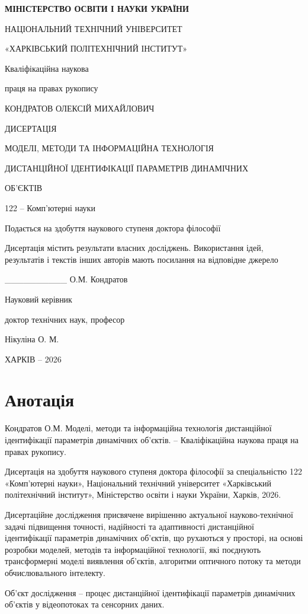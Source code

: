\documentclass[
]{article}
\author{}
\date{}
\begin{document}
\textbf{МІНІСТЕРСТВО ОСВІТИ І НАУКИ УКРАЇНИ}

НАЦІОНАЛЬНИЙ ТЕХНІЧНИЙ УНІВЕРСИТЕТ

«ХАРКІВСЬКИЙ ПОЛІТЕХНІЧНИЙ ІНСТИТУТ»

Кваліфікаційна наукова

праця на правах рукопису

КОНДРАТОВ ОЛЕКСІЙ МИХАЙЛОВИЧ

ДИСЕРТАЦІЯ

МОДЕЛІ, МЕТОДИ ТА ІНФОРМАЦІЙНА ТЕХНОЛОГІЯ

ДИСТАНЦІЙНОЇ ІДЕНТИФІКАЦІЇ ПАРАМЕТРІВ ДИНАМІЧНИХ

ОБ'ЄКТІВ

122 -- Комп'ютерні науки

Подається на здобуття наукового ступеня доктора філософії

Дисертація містить результати власних досліджень. Використання ідей, результатів і текстів інших авторів мають посилання на відповідне джерело

\_\_\_\_\_\_\_\_\_\_ О.М. Кондратов

Науковий керівник

доктор технічних наук, професор

Нікуліна О. М.

ХАРКІВ -- 2026

\section{Анотація}\label{ux430ux43dux43eux442ux430ux446ux456ux44f}

Кондратов О.М. Моделі, методи та інформаційна технологія дистанційної ідентифікації параметрів динамічних об'єктів. -- Кваліфікаційна наукова праця на правах рукопису.

Дисертація на здобуття наукового ступеня доктора філософії за спеціальністю 122 «Комп'ютерні науки», Національний технічний університет «Харківський політехнічний інститут», Міністерство освіти і науки України, Харків, 2026.

Дисертаційне дослідження присвячене вирішенню актуальної науково-технічної задачі підвищення точності, надійності та адаптивності дистанційної ідентифікації параметрів динамічних об'єктів, що рухаються у просторі, на основі розробки моделей, методів та інформаційної технології, які поєднують трансформерні моделі виявлення об'єктів, алгоритми оптичного потоку та методи обчислювального інтелекту.

Об'єкт дослідження -- процес дистанційної ідентифікації параметрів динамічних об'єктів у відеопотоках та сенсорних даних.
\end{document}
